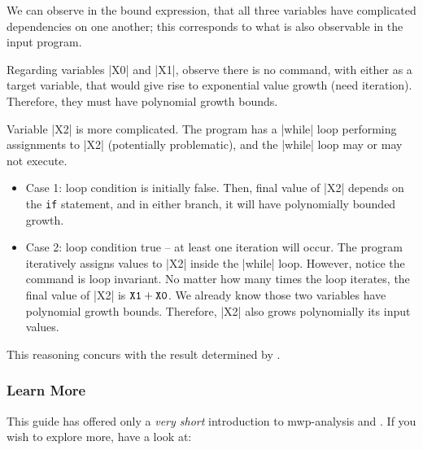 We can observe in the bound expression, that all three variables have
complicated dependencies on one another; this corresponds to what is also
observable in the input program.

Regarding variables \pr|X0| and \pr|X1|, observe there is no command, with
either as a target variable, that would give rise to exponential value growth
(need iteration). Therefore, they must have polynomial growth bounds.

Variable \pr|X2| is more complicated. The program has a \pr|while| loop
performing assignments to \pr|X2| (potentially problematic), and the \pr|while|
loop may or may not execute.

\begin{itemize}

\item Case 1: loop condition is initially false. Then, final value of \pr|X2|
depends on the \texttt{if} statement, and in either branch, it will have
polynomially bounded growth.

\item Case 2: loop condition true -- at least one iteration will occur. The
program iteratively assigns values to \pr|X2| inside the \pr|while| loop.
However, notice the command is loop invariant. No matter how
many times the loop iterates, the final value of \pr|X2| is \(\prm{X1} +
\prm{X0}\). We already know those two variables have polynomial growth bounds.
Therefore, \pr|X2| also grows polynomially \wrt its input values.

\end{itemize}

This reasoning concurs with the result determined by .

\subsubsection{Learn More}
\label{guide-learn-more}

This guide has offered only a \emph{very short} introduction to mwp-analysis and
. If you wish to explore more, have a look at:

